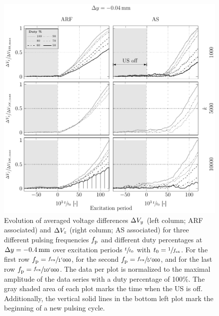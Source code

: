 \begin{figure}[tbp]
  \centering
  \includegraphics[]{External/PU-duty-m04.pdf}
  \caption{Evolution of averaged voltage differences $\Delta V_{y}$ (left column; 
    ARF associated) and $\Delta V_{z}$ (right column; AS associated) for three 
    different pulsing frequencies $f_{\mathrm{p}}$ and different duty percentages at 
    $\Dy=\SI{-0.4}{\mm}$ over excitation periods $\sfrac{t}{t_{0}}$ with 
    $t_{0}=\sfrac{1}{f_{\mathrm{ex}}}$. For the first row $f_{\mathrm{p}}=\sfrac{f_{\mathrm{ex}}}{1'000}$, for 
    the second $f_{\mathrm{p}}=\sfrac{f_{\mathrm{ex}}}{5'000}$, and for the last row 
    $f_{\mathrm{p}}=\sfrac{f_{\mathrm{ex}}}{10'000}$. The data per plot is normalized to the maximal 
    amplitude of the data series with a duty percentage of 100\%. The gray 
    shaded area of each plot marks the time when the US is off. Additionally, 
    the vertical solid lines in the bottom left plot mark the beginning of a 
    new pulsing cycle.
}\label{fig:PU-duty-m04}
\end{figure}

